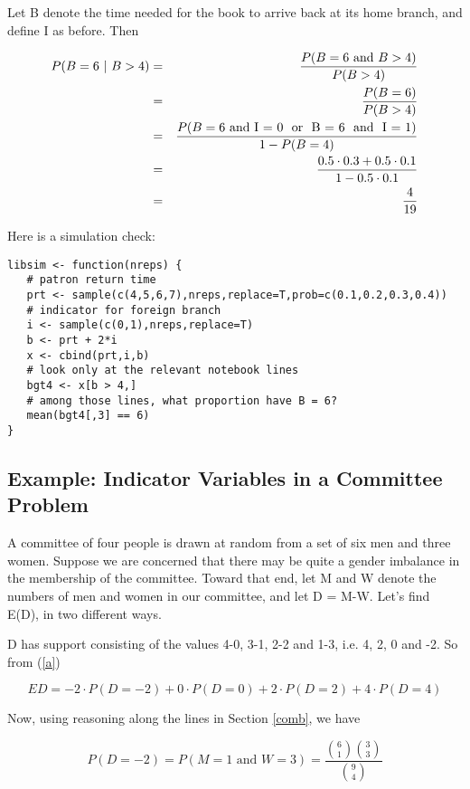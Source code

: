 Let B denote the time needed for the book to arrive back at its home
branch, and define I as before.  Then

\begin{eqnarray}
P(B = 6 ~|~ B > 4) &=& \frac{P(B = 6 \textrm{ and } B > 4)}{P(B > 4)}\\ 
&=& \frac{P(B = 6)}{P(B > 4)} \\
&=& \frac{P(B = 6 \textrm{ and I = 0 \textrm{ or } B = 6 \textrm{ and }
I = 1})}
{1 - P(B = 4)} \\
&=& \frac{0.5 \cdot 0.3 + 0.5 \cdot 0.1}
{1 - 0.5 \cdot 0.1} \\
&=& \frac{4}{19}
\end{eqnarray}

Here is a simulation check:

\begin{lstlisting}
libsim <- function(nreps) {
   # patron return time
   prt <- sample(c(4,5,6,7),nreps,replace=T,prob=c(0.1,0.2,0.3,0.4))
   # indicator for foreign branch
   i <- sample(c(0,1),nreps,replace=T)
   b <- prt + 2*i
   x <- cbind(prt,i,b)
   # look only at the relevant notebook lines
   bgt4 <- x[b > 4,]
   # among those lines, what proportion have B = 6?
   mean(bgt4[,3] == 6)
}                               
\end{lstlisting}

\subsection{Example:  Indicator Variables in a Committee Problem}
\label{combex}

A committee of four people is drawn at random from a set of six men and
three women.  Suppose we are concerned that there may be quite a gender
imbalance in the membership of the committee.  Toward that end, let M
and W denote the numbers of men and women in our committee, and let D =
M-W.  Let's find E(D), in two different ways.

D has support consisting of the values 4-0, 3-1, 2-2 and 1-3, i.e. 4, 2,
0 and -2.  So from (\ref{a})

\begin{equation}
\label{ed}
ED = 
-2 \cdot P(D = -2) +
0 \cdot P(D = 0) +
2 \cdot P(D = 2) +
4 \cdot P(D = 4) 
\end{equation}

Now, using reasoning along the lines in Section \ref{comb}, we have

\begin{equation}
P(D = -2) = P(M = 1 \textrm{ and } W = 3) =
\frac
{\binom{6}{1} \binom{3}{3}}
{\binom{9}{4}} 
\end{equation}

